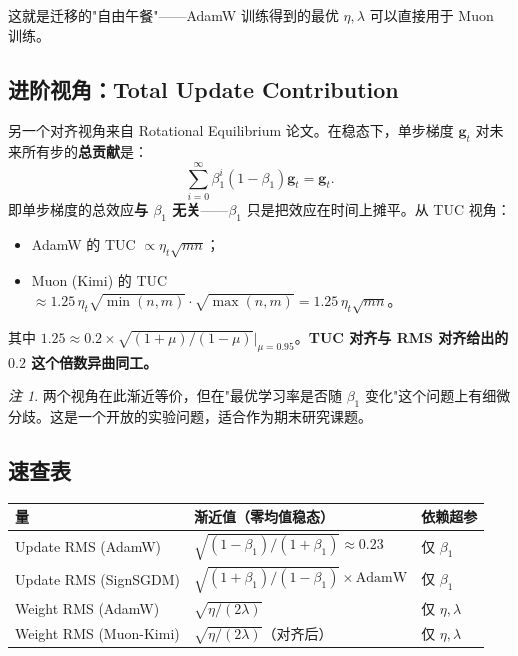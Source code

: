 \documentclass[11pt,a4paper]{ctexart}
\theoremstyle{definition}
\theoremstyle{remark}
\newtheorem{remark}[theorem]{注}
\begin{document}
这就是迁移的"自由午餐"——AdamW 训练得到的最优 $\eta, \lambda$ 可以直接用于 Muon 训练。
 
\subsection{进阶视角：Total Update Contribution}
 
另一个对齐视角来自 Rotational Equilibrium 论文。在稳态下，单步梯度 $\bm{g}_t$ 对未来所有步的\textbf{总贡献}是：
\begin{equation}
\sum_{i=0}^{\infty} \beta_1^i (1-\beta_1) \bm{g}_t = \bm{g}_t.
\end{equation}
即单步梯度的总效应\textbf{与 $\beta_1$ 无关}——$\beta_1$ 只是把效应在时间上摊平。从 TUC 视角：
\begin{itemize}
    \item AdamW 的 TUC $\propto \eta_t \sqrt{mn}$；
    \item Muon (Kimi) 的 TUC $\approx 1.25\, \eta_t \sqrt{\min(n,m)} \cdot \sqrt{\max(n,m)} = 1.25\, \eta_t \sqrt{mn}$。
\end{itemize}
其中 $1.25 \approx 0.2 \times \sqrt{(1+\mu)/(1-\mu)}|_{\mu=0.95}$。\textbf{TUC 对齐与 RMS 对齐给出的 $0.2$ 这个倍数异曲同工。}
 
\begin{remark}
两个视角在此渐近等价，但在"最优学习率是否随 $\beta_1$ 变化"这个问题上有细微分歧。这是一个开放的实验问题，适合作为期末研究课题。
\end{remark}
 
\subsection{速查表}
 
\begin{center}
\renewcommand{\arraystretch}{1.5}
\begin{tabular}{lll}
\toprule
量 & 渐近值（零均值稳态） & 依赖超参 \\
\midrule
Update RMS (AdamW) & $\sqrt{(1-\beta_1)/(1+\beta_1)} \approx 0.23$ & 仅 $\beta_1$ \\
Update RMS (SignSGDM) & $\sqrt{(1+\beta_1)/(1-\beta_1)} \times \text{AdamW}$ & 仅 $\beta_1$ \\
Weight RMS (AdamW) & $\sqrt{\eta/(2\lambda)}$ & 仅 $\eta, \lambda$ \\
Weight RMS (Muon-Kimi) & $\sqrt{\eta/(2\lambda)}$（对齐后） & 仅 $\eta, \lambda$ \\
\bottomrule
\end{tabular}
\end{center}
 
\end{document}
